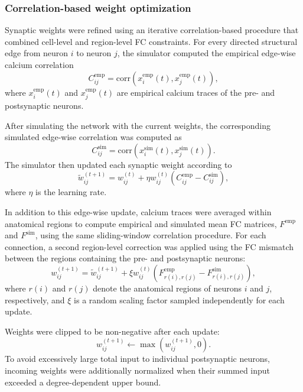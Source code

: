 \documentclass[9pt,twoside]{pnas-new}
\begin{document}
\subsubsection*{Correlation-based weight optimization}

Synaptic weights were refined using an iterative correlation-based procedure that combined
cell-level and region-level FC constraints. For every directed structural edge from neuron $i$ to neuron $j$, the simulator computed the
empirical edge-wise calcium correlation
\begin{equation}
  C^{\mathrm{emp}}_{ij}
  =
  \mathrm{corr}
  \left(
  x^{\mathrm{emp}}_i(t),
  x^{\mathrm{emp}}_j(t)
  \right),
\end{equation}
where $x^{\mathrm{emp}}_i(t)$ and $x^{\mathrm{emp}}_j(t)$ are empirical calcium traces of the
pre- and postsynaptic neurons.

After simulating the network with the current weights, the corresponding simulated edge-wise
correlation was computed as
\begin{equation}
  C^{\mathrm{sim}}_{ij}
  =
  \mathrm{corr}
  \left(
  x^{\mathrm{sim}}_i(t),
  x^{\mathrm{sim}}_j(t)
  \right).
\end{equation}
The simulator then updated each synaptic weight according to
\begin{equation}
  \tilde{w}_{ij}^{(t+1)}
  =
  w_{ij}^{(t)}
  +
  \eta
  w_{ij}^{(t)}
  \left(
  C^{\mathrm{emp}}_{ij}
  -
  C^{\mathrm{sim}}_{ij}
  \right),
\end{equation}
where $\eta$ is the learning rate.

In addition to this edge-wise update, calcium traces were averaged within anatomical regions
to compute empirical and simulated mean FC matrices, $F^{\mathrm{emp}}$ and
$F^{\mathrm{sim}}$, using the same sliding-window correlation procedure. For each connection,
a second region-level correction was applied using the FC mismatch between the regions
containing the pre- and postsynaptic neurons:
\begin{equation}
  w_{ij}^{(t+1)}
  =
  \tilde{w}_{ij}^{(t+1)}
  +
  \xi w_{ij}^{(t)}
  \left(
  F^{\mathrm{emp}}_{r(i),r(j)}
  -
  F^{\mathrm{sim}}_{r(i),r(j)}
  \right)
  ,
\end{equation}
where $r(i)$ and $r(j)$ denote the anatomical regions of neurons $i$ and $j$, respectively,
and $\xi$ is a random scaling factor sampled independently for each update.

Weights were clipped to be non-negative after each update:
\begin{equation}
  w_{ij}^{(t+1)} \leftarrow \max \left( w_{ij}^{(t+1)}, 0 \right).
\end{equation}
To avoid excessively large total input to individual postsynaptic neurons, incoming weights
were additionally normalized when their summed input exceeded a degree-dependent upper bound.
\end{document}
